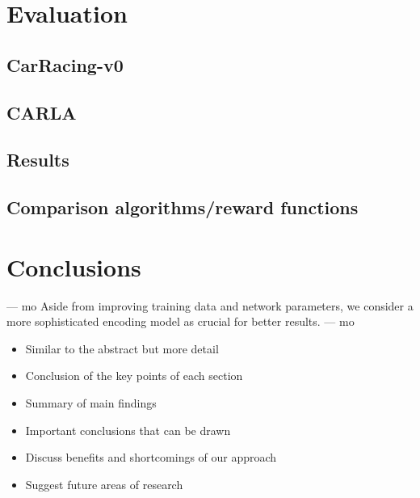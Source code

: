 \documentclass[letterpaper, 10 pt, conference]{ieeeconf}  %
\begin{document}

\section{Evaluation}

\subsection{CarRacing-v0}
\subsection{CARLA}

\subsection{Results}
\subsection{Comparison algorithms/reward functions}

\section{Conclusions}
--- mo 
Aside from improving training data and network parameters, we 
consider a more sophisticated encoding model as crucial for better results. 
--- mo
\begin{itemize}
      \item Similar to the abstract but more detail
      \item Conclusion of the key points of each section
      \item Summary of main findings
      \item Important conclusions that can be drawn
      \item Discuss benefits and shortcomings of our approach
      \item Suggest future areas of research
   \end{itemize}


\addtolength{\textheight}{-12cm}   %
\end{document}
